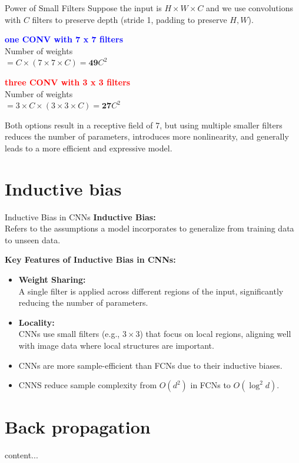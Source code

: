 \documentclass[serif, aspectratio=169]{beamer}
\begin{document}
	\begin{frame}{Power of Small Filters}
		Suppose the input is $H \times W \times C$ and we use convolutions with $C$ filters to preserve depth (stride 1, padding to preserve $H, W$).
		
		\bigskip
		\begin{minipage}{0.45\textwidth}
			\textcolor{blue}{\textbf{one CONV with 7 x 7 filters}} \\
			Number of weights \\
			$= C \times (7 \times 7 \times C) = \textbf{49} C^2$
		\end{minipage}
		\hfill
		\begin{minipage}{0.45\textwidth}
			\textcolor{red}{\textbf{three CONV with 3 x 3 filters}} \\
			Number of weights \\
			$= 3 \times C \times (3 \times 3 \times C) = \textbf{27} C^2$
		\end{minipage}
		\bigskip
		\begin{flushleft}
			Both options result in a receptive field of 7, but using multiple smaller filters reduces the number of parameters, introduces more nonlinearity, and generally leads to a more efficient and expressive model.
		\end{flushleft}
	\end{frame}
	\section{Inductive bias}
	
		
	\begin{frame}{Inductive Bias in CNNs}
		\textbf{Inductive Bias:} \\
		Refers to the assumptions a model incorporates to generalize from training data to unseen data.
		
		\bigskip
		\textbf{Key Features of Inductive Bias in CNNs:}
		\begin{itemize}
			\item \textbf{Weight Sharing:} \\
			A single filter is applied across different regions of the input, significantly reducing the number of parameters.
			
			\item \textbf{Locality:} \\
			CNNs use small filters (e.g., $3 \times 3$) that focus on local regions, aligning well with image data where local structures are important.
			
			\item CNNs are more sample-efficient than FCNs due to their inductive biases.
			\item CNNS reduce sample complexity from $O(d^2)$ in FCNs to $O(\log^2 d)$.
		\end{itemize}
	\end{frame}
	
	
	\section{Back propagation}
	\begin{frame}
		content...
	\end{frame}
	
	
	
	

	
	
	
	
\end{document}
